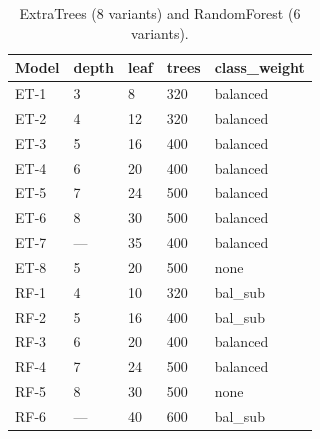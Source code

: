 \documentclass[cameraready]{Interspeech}
\begin{document}
\begin{table}[H]
\centering
\caption{ExtraTrees (8 variants) and RandomForest (6 variants).}
\label{tab:et_specs}
\begin{tabularx}{\columnwidth}{lXXXX}
\toprule
Model & depth & leaf & trees & class\_weight \\
\midrule
ET-1 & 3   & 8  & 320 & balanced \\
ET-2 & 4   & 12 & 320 & balanced \\
ET-3 & 5   & 16 & 400 & balanced \\
ET-4 & 6   & 20 & 400 & balanced \\
ET-5 & 7   & 24 & 500 & balanced \\
ET-6 & 8   & 30 & 500 & balanced \\
ET-7 & --- & 35 & 400 & balanced \\
ET-8 & 5   & 20 & 500 & none \\
\midrule
RF-1 & 4   & 10 & 320 & bal\_sub \\
RF-2 & 5   & 16 & 400 & bal\_sub \\
RF-3 & 6   & 20 & 400 & balanced \\
RF-4 & 7   & 24 & 500 & balanced \\
RF-5 & 8   & 30 & 500 & none \\
RF-6 & --- & 40 & 600 & bal\_sub \\
\bottomrule
\end{tabularx}
\end{table}
\end{document}
